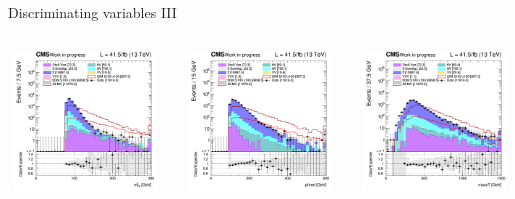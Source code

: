 \documentclass[8pt]{beamer}
\begin{document}
\begin{frame}{Discriminating variables III}
\begin{columns}
\begin{column}{1.09\textwidth}
\begin{block}{}\end{block} \vspace{5pt}
\end{column}
\end{columns} \vspace{-5pt}
\begin{columns}
		\begin{column}{0.33\textwidth}
			\begin{center}
     			\includegraphics[width=1.0\textwidth, height=105pt]{figs/2017/SmearSR-ttDM-scalar100/log_cratio_topCR_ll_mt2ll.png}
    		\end{center}		
		\end{column} 
		\begin{column}{0.33\textwidth}
			\begin{center}
     			\includegraphics[width=1.0\textwidth, height=105pt]{figs/2017/SmearSR-ttDM-scalar100/log_cratio_topCR_ll_METcorrected_pt.png}
    		\end{center}		
		\end{column} 
		\begin{column}{0.33\textwidth}
			\begin{center}
     			\includegraphics[width=1.0\textwidth, height=105pt]{figs/2017/SmearSR-ttDM-scalar100/log_cratio_topCR_ll_massT.png}

\end{center}
\end{column}
\end{columns}
\end{frame}
\end{document}
